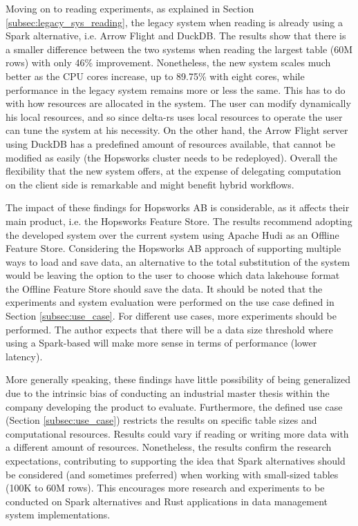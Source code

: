 Moving on to reading experiments, as explained in Section \ref{subsec:legacy_sys_reading}, the legacy system when reading is already using a Spark alternative, i.e. Arrow Flight and DuckDB. The results show that there is a smaller difference between the two systems when reading the largest table (60M rows) with only 46\% improvement. Nonetheless, the new system scales much better as the \gls{CPU} cores increase, up to 89.75\% with eight cores, while performance in the legacy system remains more or less the same. This has to do with how resources are allocated in the system. The user can modify dynamically his local resources, and so since delta-rs uses local resources to operate the user can tune the system at his necessity. On the other hand, the Arrow Flight server using DuckDB has a predefined amount of resources available, that cannot be modified as easily (the Hopsworks cluster needs to be redeployed). Overall the flexibility that the new system offers, at the expense of delegating computation on the client side is remarkable and might benefit hybrid workflows.

The impact of these findings for Hopsworks \gls{AB} is considerable, as it affects their main product, i.e. the Hopsworks Feature Store. The results recommend adopting the developed system over the current system using Apache Hudi as an Offline Feature Store. Considering the Hopsworks \gls{AB} approach of supporting multiple ways to load and save data, an alternative to the total substitution of the system would be leaving the option to the user to choose which data lakehouse format the Offline Feature Store should save the data. It should be noted that the experiments and system evaluation were performed on the use case defined in Section \ref{subsec:use_case}. For different use cases, more experiments should be performed. The author expects that there will be a data size threshold where using a Spark-based will make more sense in terms of performance (lower latency).

More generally speaking, these findings have little possibility of being generalized due to the intrinsic bias of conducting an industrial master thesis within the company developing the product to evaluate. Furthermore, the defined use case (Section \ref{subsec:use_case}) restricts the results on specific table sizes and computational resources. Results could vary if reading or writing more data with a different amount of resources. Nonetheless, the results confirm the research expectations, contributing to supporting the idea that Spark alternatives should be considered (and sometimes preferred) when working with small-sized tables (100K to 60M rows). This encourages more research and experiments to be conducted on Spark alternatives and Rust applications in data management system implementations. 

